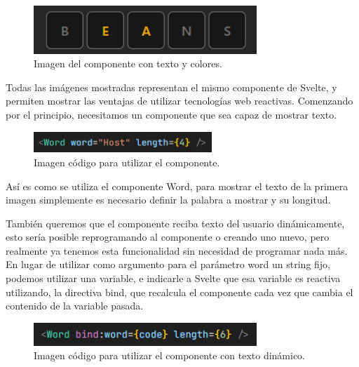 \begin{figure}[H]
	\centering
	\includegraphics[clip=true, width=0.75\textwidth]{images/reusing/colored_component.png}
	\caption{Imagen del componente con texto y colores.}
	\label{fig:comp_colored}
\end{figure}

Todas las imágenes mostradas representan el mismo componente de Svelte, y permiten mostrar las ventajas de utilizar tecnologías web reactivas.
Comenzando por el principio, necesitamos un componente que sea capaz de mostrar texto.

\begin{figure}[H]
	\centering
	\includegraphics[clip=true, width=0.6\textwidth]{images/reusing/code_simple_component.png}
	\caption{Imagen código para utilizar el componente.}
	\label{fig:comp_simple_code}
\end{figure}

Así es como se utiliza el componente Word, para mostrar el texto de la primera imagen simplemente es necesario definir la palabra a mostrar y su longitud.

También queremos que el componente reciba texto del usuario dinámicamente, esto sería posible reprogramando al componente o creando uno nuevo, pero realmente ya tenemos esta funcionalidad sin necesidad de programar nada más. En lugar de utilizar como argumento para el parámetro word un string fijo, podemos utilizar una variable, e indicarle a Svelte que esa variable es reactiva utilizando, la directiva bind, que recalcula el componente cada vez que cambia el contenido de la variable pasada.

\begin{figure}[H]
	\centering
	\includegraphics[clip=true, width=0.75\textwidth]{images/reusing/code_dyn_component.png}
	\caption{Imagen código para utilizar el componente con texto dinámico.}
	\label{fig:comp_dyn_code}
\end{figure}

